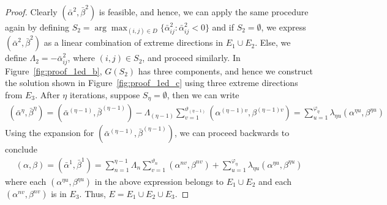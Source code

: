 \documentclass[10pt]{article}
\newcommand{\validdriveset}{D}
\theoremstyle{definition}
\begin{document}
\begin{proof}
Clearly $(\bar{\alpha}^2, \bar{\beta}^2)$ is feasible, and hence, we can apply the same procedure again by defining $S_2 = \arg \max_{(i,j) \in \validdriveset} \{ \bar{\alpha}^2_{ij}: \bar{\alpha}^2_{ij} < 0\}$ and if $S_2 = \emptyset$, we express $(\bar{\alpha}^2, \bar{\beta}^2)$ as a linear combination of extreme directions in $E_1 \cup E_2$. Else, we define $\Lambda_2 = -\bar{\alpha}^2_{ij}$, where $(i, j) \in S_2$, and proceed similarly. In Figure~\ref{fig:proof_1ed_b}, $G(S_2)$ has three components, and hence we construct the solution shown in Figure~\ref{fig:proof_1ed_c} using three extreme directions from $E_3$. After $\eta$ iterations, suppose $S_{\eta} = \emptyset$, then we can write 
\begin{align}
    (\bar{\alpha}^{\eta}, \bar{\beta}^{\eta}) = (\bar{\alpha}^{(\eta - 1)}, \bar{\beta}^{(\eta - 1)}) - \Lambda_{(\eta-1)} \sum_{v=1}^{\vartheta_{(\eta-1)}} (\alpha^{(\eta-1)v}, \beta^{(\eta-1)v}) = \sum_{u=1}^{\varphi_{\eta}} \lambda_{\eta u}(\alpha^{\eta u}, \beta^{\eta u})
\end{align}
Using the expansion for $(\bar{\alpha}^{(\eta - 1)}, \bar{\beta}^{(\eta - 1)})$, we can proceed backwards to conclude 
\begin{align}
    (\alpha, \beta) = (\bar{\alpha}^1, \bar{\beta}^1) = \sum_{n=1}^{\eta-1} \Lambda_n \sum_{v=1}^{\vartheta_n} (\alpha^{nv}, \beta^{nv}) + \sum_{u=1}^{\varphi_{\eta}} \lambda_{\eta u}(\alpha^{\eta u}, \beta^{\eta u})
\end{align}
where each $(\alpha^{\eta u}, \beta^{\eta u})$ in the above expression belongs to $E_1 \cup E_2$ and each $(\alpha^{nv}, \beta^{nv})$ is in $E_3$. Thus, $E = E_1 \cup E_2 \cup E_3$. 


\end{proof}
\end{document}
